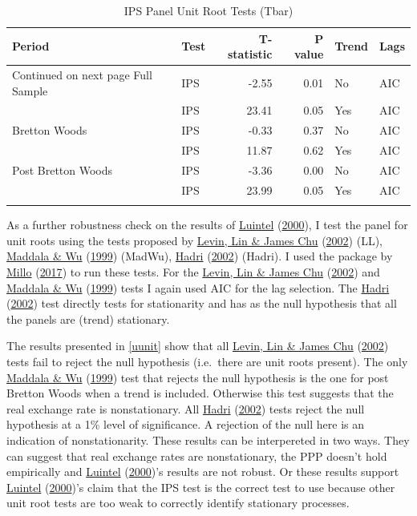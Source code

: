 \documentclass[11pt,preprint, authoryear]{elsarticle}
\numberwithin{equation}{section}
\numberwithin{figure}{section}
\numberwithin{table}{section}
\begin{document}
\begingroup\fontsize{12pt}{13pt}\selectfont
\begin{longtable}{llrrll}
\caption{IPS Panel Unit Root Tests (Tbar)} \\ 
  \toprule
Period & Test & T-statistic & P value & Trend & Lags \\ 
  \hline 
\endhead 
\hline 
{\footnotesize Continued on next page} 
\endfoot 
\endlastfoot 
 \midrule
Full Sample & IPS & -2.55 & 0.01 & No & AIC \\ 
   & IPS & 23.41 & 0.05 & Yes & AIC \\ 
  Bretton Woods & IPS & -0.33 & 0.37 & No & AIC \\ 
   & IPS & 11.87 & 0.62 & Yes & AIC \\ 
  Post Bretton Woods & IPS & -3.36 & 0.00 & No & AIC \\ 
   & IPS & 23.99 & 0.05 & Yes & AIC \\ 
   \bottomrule
\label{ipsAIC}
\end{longtable}
\endgroup

As a further robustness check on the results of
\protect\hyperlink{ref-Kul}{Luintel}
(\protect\hyperlink{ref-Kul}{2000}), I test the panel for unit roots
using the tests proposed by \protect\hyperlink{ref-lev}{Levin, Lin \&
James Chu} (\protect\hyperlink{ref-lev}{2002}) (LL),
\protect\hyperlink{ref-wu}{Maddala \& Wu}
(\protect\hyperlink{ref-wu}{1999}) (MadWu),
\protect\hyperlink{ref-had}{Hadri} (\protect\hyperlink{ref-had}{2002})
(Hadri). I used the package by \protect\hyperlink{ref-plm}{Millo}
(\protect\hyperlink{ref-plm}{2017}) to run these tests. For the
\protect\hyperlink{ref-lev}{Levin, Lin \& James Chu}
(\protect\hyperlink{ref-lev}{2002}) and
\protect\hyperlink{ref-wu}{Maddala \& Wu}
(\protect\hyperlink{ref-wu}{1999}) tests I again used AIC for the lag
selection. The \protect\hyperlink{ref-had}{Hadri}
(\protect\hyperlink{ref-had}{2002}) test directly tests for stationarity
and has as the null hypothesis that all the panels are (trend)
stationary.

The results presented in \ref{uunit} show that all
\protect\hyperlink{ref-lev}{Levin, Lin \& James Chu}
(\protect\hyperlink{ref-lev}{2002}) tests fail to reject the null
hypothesis (i.e.~there are unit roots present). The only
\protect\hyperlink{ref-wu}{Maddala \& Wu}
(\protect\hyperlink{ref-wu}{1999}) test that rejects the null hypothesis
is the one for post Bretton Woods when a trend is included. Otherwise
this test suggests that the real exchange rate is nonstationary. All
\protect\hyperlink{ref-had}{Hadri} (\protect\hyperlink{ref-had}{2002})
tests reject the null hypothesis at a 1\% level of significance. A
rejection of the null here is an indication of nonstationarity. These
results can be interpereted in two ways. They can suggest that real
exchange rates are nonstationary, the PPP doesn't hold empirically and
\protect\hyperlink{ref-Kul}{Luintel}
(\protect\hyperlink{ref-Kul}{2000})'s results are not robust. Or these
results support \protect\hyperlink{ref-Kul}{Luintel}
(\protect\hyperlink{ref-Kul}{2000})'s claim that the IPS test is the
correct test to use because other unit root tests are too weak to
correctly identify stationary processes.
\end{document}
